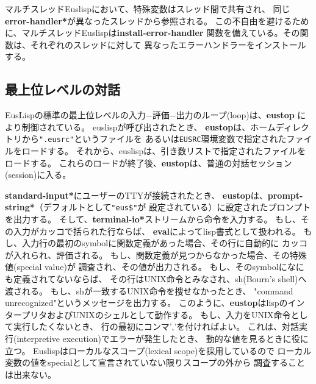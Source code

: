 マルチスレッドEuslispにおいて、特殊変数はスレッド間で共有され、
同じ{\bf *error-handler*}が異なったスレッドから参照される。
この不自由を避けるために、マルチスレッドEuslispは{\bf install-error-handler}
関数を備えている。その関数は、それぞれのスレッドに対して
異なったエラーハンドラーをインストールする。

\begin{refdesc}


\end{refdesc}

\newpage

\subsection{最上位レベルの対話}

EusLispの標準の最上位レベルの入力−評価−出力のループ(loop)は、{\bf eustop}
により制御されている。
euslispが呼び出されたとき、
{\bf eustop}は、ホームディレクトリから{\tt ".eusrc"}というファイルを
あるいは{\tt EUSRC}環境変数で指定されたファイルをロードする。
それから、euslispは、引き数リストで指定されたファイルをロードする。
これらのロードが終了後、{\bf eustop}は、普通の対話セッション(session)に入る。

{\bf *standard-input*}にユーザーのTTYが接続されたとき、
{\bf eustop}は、{\bf *prompt-string*}（デフォルトとして{\tt "eus\$"}が
設定されている）に設定されたプロンプトを出力する。
そして、{\bf *terminal-io*}ストリームから命令を入力する。
もし、その入力がカッコで括られた行ならば、
{\bf eval}によってlisp書式として扱われる。
もし、入力行の最初のsymbolに関数定義があった場合、その行に自動的に
カッコが入れられ、評価される。
もし、関数定義が見つからなかった場合、その特殊値(special value)が
調査され、その値が出力される。
もし、そのsymbolになにも定義されてないならば、
その行はUNIX命令とみなされ、sh(Bourn's shell)へ渡される。
もし、shが一致するUNIX命令を捜せなかったとき、
"command unrecognized"というメッセージを出力する。
このように、{\bf eustop}はlispのインタープリタおよびUNIXのシェルとして動作する。
もし、入力をUNIX命令として実行したくないとき、
行の最初にコンマ','を付ければよい。
これは、対話実行(interpretive execution)でエラーが発生したとき、
動的な値を見るときに役に立つ。
Euslispはローカルなスコープ(lexical scope)を採用しているので
ローカル変数の値をspecialとして宣言されていない限りスコープの外から
調査することは出来ない。

